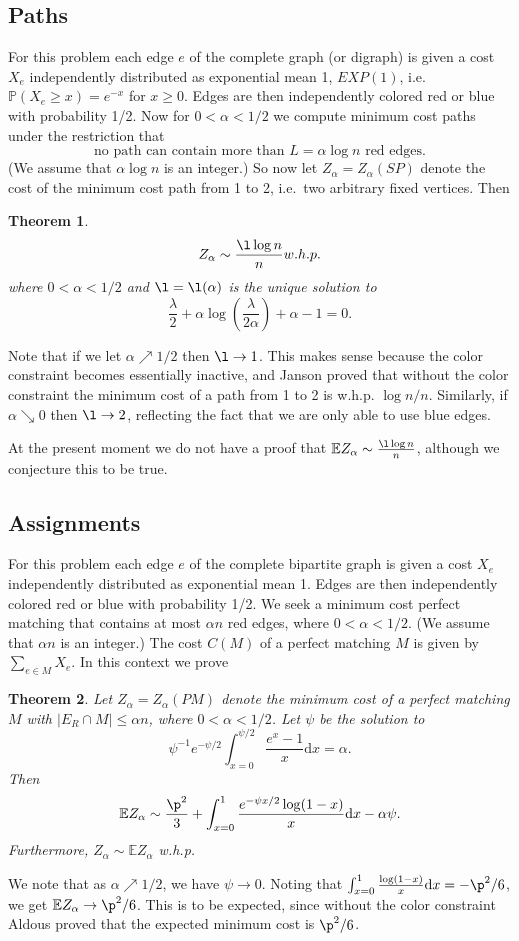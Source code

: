 \documentclass[12pt]{article}
\newcommand{\1}{\textbf{1}}
\def\a{\alpha} \def\b{\beta} \def\d{\delta} \def\D{\Delta}
\newtheorem{theorem}{Theorem}
\def\dd{\text{d}}
\def\E{\mathbb{E}}
\def\Pr{\mathbb{P}}
\newcommand{\beq}[2]{\begin{equation}\label{#1}#2\end{equation}}
\begin{document}
\subsection{Paths}
For this problem each edge $e$ of the complete graph (or digraph) is given a cost $X_e$ independently distributed as exponential mean 1, $EXP(1)$, i.e. $\Pr(X_e\geq x)=e^{-x}$ for $x\geq 0$. Edges are then independently colored red or blue with probability 1/2. Now for $0<\a < 1/2$ we compute minimum cost paths under the restriction that 
\beq{pathcolors}{
\text{no path can contain more than $L=\a\log n$ red edges.}
}
 (We assume that $\a\log n$ is an integer.) So now let $Z_\a=Z_{\a}(SP)$ denote the cost of the minimum cost path from 1 to 2, i.e.~two arbitrary fixed vertices. Then  
\begin{theorem}\label{th2}
\beq{RHS}{
Z_\a\sim\frac{\l\log n}{n} w.h.p.%
}
where $0<\a<1/2$ and $\l=\l(\a)$ is the unique solution to
\[
 \frac{\lambda}{2}+\a\log\!\left(\frac{\lambda}{2\a}\right)+\a-1=0.
\]
\end{theorem}
Note that if we let $\a \nearrow 1/2$ then $\l \rightarrow 1$. This makes sense because the color constraint becomes essentially inactive, and Janson \cite{J2} proved that without the color constraint the minimum cost of a path from 1 to 2 is w.h.p. $\log n /n$. Similarly, if  $\a\searrow 0$ then $\l\to2$, reflecting the fact that we are only able to use blue edges. 

At the present moment we do not have a proof that $\E Z_{\a}\sim  \frac{\l\log n}{n}$, although we conjecture this to be true.
\subsection{Assignments}
For this problem each edge $e$ of the complete bipartite graph is given a cost $X_e$ independently distributed as exponential mean 1. Edges are then independently colored red or blue with probability 1/2. We seek a minimum cost perfect matching that contains at most $\a n$ red edges, where $0<\a<1/2$. (We assume that $\a n$ is an integer.) The cost $C(M)$ of a perfect  matching $M$ is given by $\sum_{e\in M}X_e$. In this context we prove 
\begin{theorem}\label{th3}
Let $Z_\a=Z_{\a}(PM)$ denote the minimum cost of a perfect matching $M$ with $|E_R\cap M|\leq \a n$, where $0<\a<1/2$. Let $\psi$ be the solution to
\[
\psi^{-1}e^{-\psi/2}\int_{x=0}^{\psi/2}\frac{e^x-1}{x}\dd x=\a.
\]
Then
\beq{PMcost}{
\E Z_{\a}\sim\frac{\p^2}{3}+\int_{x=0}^1\frac{e^{-\psi x/2}\log(1-x)}{x}\dd x-\a\psi.
}
Furthermore, $Z_\a\sim\E Z_\a$ w.h.p.
\end{theorem}
We note that as $\a\nearrow 1/2$, we have $\psi\rightarrow 0$. Noting that $\int_{x=0}^1\frac{\log(1-x)}{x}\dd x=-\p^2/6$, we get $\E Z_\a \rightarrow \p^2/6$. This is to be expected, since without the color constraint Aldous \cite{Aldous} proved that the expected minimum cost is $\p^2/6$.
\end{document}
